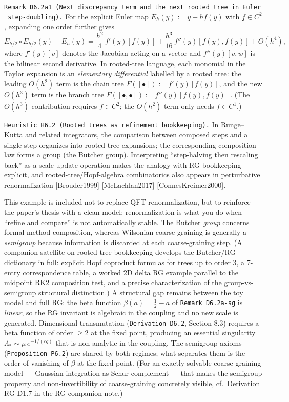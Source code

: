 \documentclass[
]{article}
\begin{document}
\texttt{Remark\ D6.2a1\ (Next\ discrepancy\ term\ and\ the\ next\ rooted\ tree\ in\ Euler\ step-doubling).}
For the explicit Euler map \(E_h(y):=y+h f(y)\) with \(f\in C^2\),
expanding one order further gives \[
E_{h/2}\!\circ E_{h/2}(y)-E_h(y)
=\frac{h^2}{4}\,f'(y)[f(y)]+\frac{h^3}{16}\,f''(y)[f(y),f(y)]+O(h^4),
\] where \(f'(y)[v]\) denotes the Jacobian acting on a vector and
\(f''(y)[v,w]\) is the bilinear second derivative. In rooted-tree
language, each monomial in the Taylor expansion is an \emph{elementary
differential} labelled by a rooted tree: the leading \(O(h^2)\) term is
the chain tree \(F([\bullet]):=f'(y)[f(y)]\), and the new \(O(h^3)\)
term is the branch tree \(F([\bullet,\bullet]):=f''(y)[f(y),f(y)]\).
(The \(O(h^3)\) contribution requires \(f\in C^2\); the \(O(h^2)\) term
only needs \(f\in C^1\).)

\texttt{Heuristic\ H6.2\ (Rooted\ trees\ as\ refinement\ bookkeeping).}
In Runge--Kutta and related integrators, the comparison between composed
steps and a single step organizes into rooted-tree expansions; the
corresponding composition law forms a group (the Butcher group).
Interpreting ``step-halving then rescaling back'' as a scale-update
operation makes the analogy with RG bookkeeping explicit, and
rooted-tree/Hopf-algebra combinatorics also appears in perturbative
renormalization {[}Brouder1999{]} {[}McLachlan2017{]}
{[}ConnesKreimer2000{]}.

This example is included not to replace QFT renormalization, but to
reinforce the paper's thesis with a clean model: renormalization is what
you do when ``refine and compare'' is not automatically stable. The
Butcher \emph{group} concerns formal method composition, whereas
Wilsonian coarse-graining is generally a \emph{semigroup} because
information is discarded at each coarse-graining step. (A companion
satellite on rooted-tree bookkeeping develops the Butcher/RG dictionary
in full: explicit Hopf coproduct formulas for trees up to order 3, a
7-entry correspondence table, a worked 2D delta RG example parallel to
the midpoint RK2 composition test, and a precise characterization of the
group-vs-semigroup structural distinction.) A structural gap remains
between the toy model and full RG: the beta function
\(\beta(a)=\tfrac12 - a\) of \texttt{Remark\ D6.2a-sg} is \emph{linear},
so the RG invariant is algebraic in the coupling and no new scale is
generated. Dimensional transmutation (\texttt{Derivation\ D6.2}, Section
8.3) requires a beta function of order \(\ge 2\) at the fixed point,
producing an essential singularity \(\Lambda_\ast\sim\mu\,e^{-1/(cg)}\)
that is non-analytic in the coupling. The semigroup axioms
(\texttt{Proposition\ P6.2}) are shared by both regimes; what separates
them is the order of vanishing of \(\beta\) at the fixed point. (For an
exactly solvable coarse-graining model --- Gaussian integration as Schur
complement --- that makes the semigroup property and non-invertibility
of coarse-graining concretely visible, cf.~Derivation RG-D1.7 in the RG
companion note.)
\end{document}
